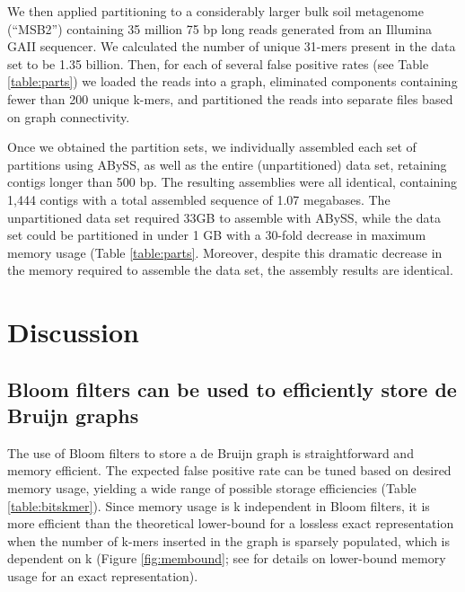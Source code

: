 \documentclass{pnastwo}
\begin{document}
\begin{article}
We then applied partitioning to a considerably larger bulk soil
metagenome (``MSB2'') containing 35 million 75 bp long reads generated
from an Illumina GAII sequencer.  We calculated the number of unique
31-mers present in the data set to be 1.35 billion. Then, for each of
several false positive rates (see Table \ref{table:parts}) we loaded
the reads into a graph, eliminated components containing fewer than
200 unique k-mers, and partitioned the reads into separate files based
on graph connectivity.

Once we obtained the partition sets, we individually assembled each
set of partitions using ABySS, as well as the entire (unpartitioned)
data set, retaining contigs longer than 500 bp.  The resulting
assemblies were all identical, containing 1,444 contigs with a total
assembled sequence of 1.07 megabases.  The unpartitioned data set
required 33GB to assemble with ABySS, while the data set could be
partitioned in under 1 GB with a 30-fold decrease in maximum memory usage
(Table \ref{table:parts}.
Moreover, despite this dramatic decrease in the memory required to assemble
the data set, the assembly results are identical.


\section{Discussion}


\subsection{Bloom filters can be used to efficiently store de Bruijn graphs}

The use of Bloom filters to store a de Bruijn graph is straightforward
and memory efficient.  The expected false positive rate can be tuned
based on desired memory usage, yielding a wide range of possible
storage efficiencies (Table \ref{table:bitskmer}). Since memory usage
is k independent in Bloom filters, it is more efficient than the
theoretical lower-bound for a lossless exact representation when the
number of k-mers inserted in the graph is sparsely populated, which is
dependent on k (Figure \ref{fig:membound}; see \cite{succinct} for
details on lower-bound memory usage for an exact representation).


\end{article}
\end{document}
